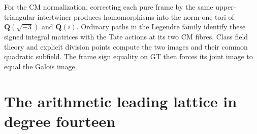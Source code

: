 \documentclass[11pt,a4paper]{article}
\theoremstyle{definition}
\theoremstyle{remark}
\newcommand{\Q}{\mathbf Q}
\begin{document}
For the CM normalization, correcting each pure frame by the same
upper-triangular intertwiner produces homomorphisms into the norm-one
tori of $\Q(\sqrt{-3})$ and $\Q(i)$.  Ordinary paths in the Legendre
family identify these signed integral matrices with the Tate actions
at its two CM fibres.  Class field theory and explicit division points
compute the two images and their common quadratic subfield.  The frame
sign equality on GT then forces its joint image to equal the Galois image.


























\section{The arithmetic leading lattice in degree fourteen}
\label{sec:degree-fourteen-lattice}



















\end{document}

